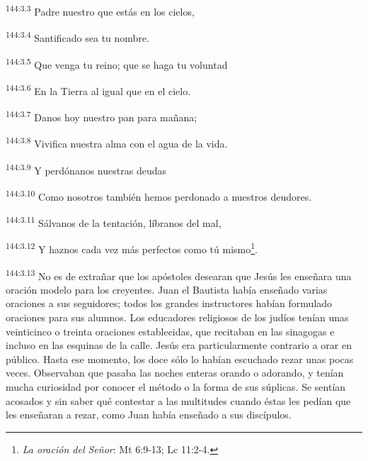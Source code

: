 \par
\textsuperscript{144:3.3} Padre nuestro que estás en los cielos,

\par
\textsuperscript{144:3.4} Santificado sea tu nombre.

\par
\textsuperscript{144:3.5} Que venga tu reino; que se haga tu voluntad

\par
\textsuperscript{144:3.6} En la Tierra al igual que en el cielo.

\par
\textsuperscript{144:3.7} Danos hoy nuestro pan para mañana;

\par
\textsuperscript{144:3.8} Vivifica nuestra alma con el agua de la vida.

\par
\textsuperscript{144:3.9} Y perdónanos nuestras deudas

\par
\textsuperscript{144:3.10} Como nosotros también hemos perdonado a nuestros deudores.

\par
\textsuperscript{144:3.11} Sálvanos de la tentación, líbranos del mal,

\par
\textsuperscript{144:3.12} Y haznos cada vez más perfectos como tú mismo\footnote{\textit{La oración del Señor}: Mt 6:9-13; Lc 11:2-4.}.\bigbreak

\par
\textsuperscript{144:3.13} No es de extrañar que los apóstoles desearan que Jesús les enseñara una oración modelo para los creyentes. Juan el Bautista había enseñado varias oraciones a sus seguidores; todos los grandes instructores habían formulado oraciones para sus alumnos. Los educadores religiosos de los judíos tenían unas veinticinco o treinta oraciones establecidas, que recitaban en las sinagogas e incluso en las esquinas de la calle. Jesús era particularmente contrario a orar en público. Hasta ese momento, los doce sólo lo habían escuchado rezar unas pocas veces. Observaban que pasaba las noches enteras orando o adorando, y tenían mucha curiosidad por conocer el método o la forma de sus súplicas. Se sentían acosados y sin saber qué contestar a las multitudes cuando éstas les pedían que les enseñaran a rezar, como Juan había enseñado a sus discípulos.

